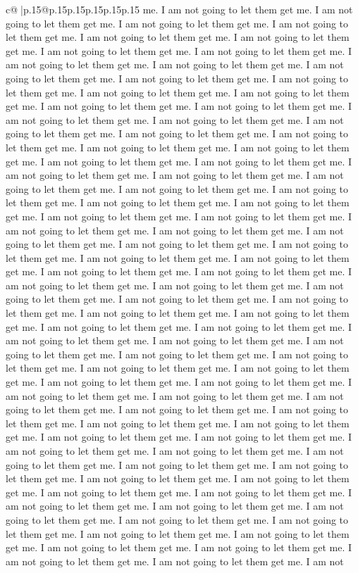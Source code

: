 \documentclass{article}
\begin{document}
{\begin{supertabular}{c@{$\;$}|p{.15\linewidth}@{}p{.15\linewidth}p{.15\linewidth}p{.15\linewidth}p{.15\linewidth}p{.15\linewidth}}
{{{me. I am not going to let them get me. I am not going to let them get me. I am not going to let them get me. I am not going to let them get me. I am not going to let them get me. I am not going to let them get me. I am not going to let them get me. I am not going to let them get me. I am not going to let them get me. I am not going to let them get me. I am not going to let them get me. I am not going to let them get me. I am not going to let them get me. I am not going to let them get me. I am not going to let them get me. I am not going to let them get me. I am not going to let them get me. I am not going to let them get me. I am not going to let them get me. I am not going to let them get me. I am not going to let them get me. I am not going to let them get me. I am not going to let them get me. I am not going to let them get me. I am not going to let them get me. I am not going to let them get me. I am not going to let them get me. I am not going to let them get me. I am not going to let them get me. I am not going to let them get me. I am not going to let them get me. I am not going to let them get me. I am not going to let them get me. I am not going to let them get me. I am not going to let them get me. I am not going to let them get me. I am not going to let them get me. I am not going to let them get me. I am not going to let them get me. I am not going to let them get me. I am not going to let them get me. I am not going to let them get me. I am not going to let them get me. I am not going to let them get me. I am not going to let them get me. I am not going to let them get me. I am not going to let them get me. I am not going to let them get me. I am not going to let them get me. I am not going to let them get me. I am not going to let them get me. I am not going to let them get me. I am not going to let them get me. I am not going to let them get me. I am not going to let them get me. I am not going to let them get me. I am not going to let them get me. I am not going to let them get me. I am not going to let them get me. I am not going to let them get me. I am not going to let them get me. I am not going to let them get me. I am not going to let them get me. I am not going to let them get me. I am not going to let them get me. I am not going to let them get me. I am not going to let them get me. I am not going to let them get me. I am not going to let them get me. I am not going to let them get me. I am not going to let them get me. I am not going to let them get me. I am not going to let them get me. I am not going to let them get me. I am not going to let them get me. I am not going to let them get me. I am not going to let them get me. I am not going to let them get me. I am not going to let them get me. I am not going to let them get me. I am not going to let them get me. I am not going to let them get me. I am not going to let them get me. I am not going to let them get me. I am not going to let them get me. I am not going to let them get me. I am not going to let them get me. I am not going to let them get me. I am not going to let them get me. I am not going to let them get me. I am not going to let them get me. I am not }}}
\end{supertabular}}
\end{document}
